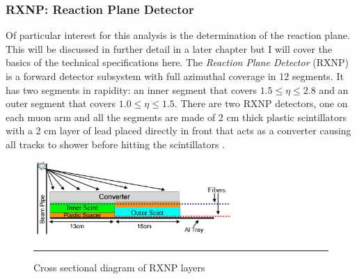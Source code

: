 \subsubsection{RXNP: Reaction Plane Detector}
Of particular interest for this analysis is the determination of the reaction plane. This will be discussed in further detail in a later chapter but I will cover the basics of the technical specifications here. The \textit{Reaction Plane Detector} (RXNP) is a forward detector subsystem \citep{RXNPfocus} with full azimuthal coverage in 12 segments. It has two segments in rapidity: an inner segment that covers $1.5 \leq \eta \leq 2.8$ and an outer segment that covers $1.0 \leq \eta \leq 1.5$. There are two RXNP detectors, one on each muon arm and all the segments are made of 2 cm thick plastic scintillators with a 2 cm layer of lead placed directly in front that acts as a converter causing all tracks to shower before hitting the scintillators \citep{RXNPfocusER}.  

\begin{figure}[h!]
  \centering
    \includegraphics[width=0.7\textwidth]{Figures/RXNPschem.jpg}
    \rule{35em}{0.5pt}
  \caption[Cross sectional diagram of RXNP layers]{Cross sectional diagram of RXNP layers}
  \label{fig:RXNP}
\end{figure}

